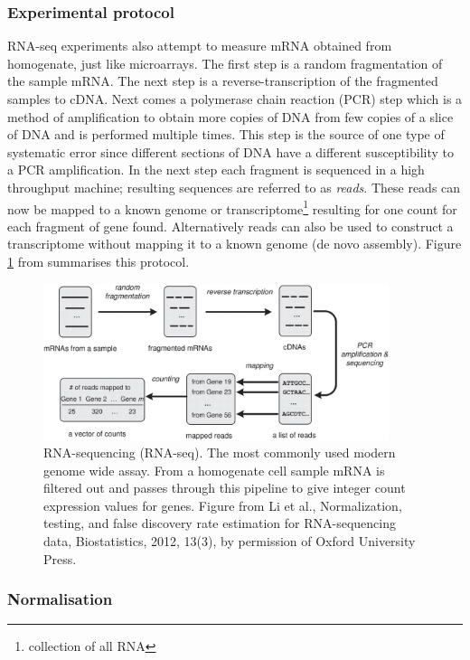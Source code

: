 \subsubsection{Experimental protocol}
\label{sec:technique-bio}

RNA-seq experiments also attempt to measure mRNA obtained from homogenate, just like microarrays. The first step is a random fragmentation of the sample mRNA. The next step is a reverse-transcription of the fragmented samples to cDNA. Next comes a polymerase chain reaction (PCR) step which is a method of amplification to obtain more copies of DNA from few copies of a slice of DNA and is performed multiple times. This step is the source of one type of systematic error since different sections of  DNA have a different susceptibility to a PCR amplification. In the next step each fragment is sequenced in a high throughput machine; resulting sequences are referred to as \emph{reads}. These reads can now be mapped to a known genome or transcriptome\footnote{collection of all RNA} resulting for one count for each fragment of gene found.  Alternatively reads can also be used to construct a transcriptome without mapping it to a known genome (de novo assembly). Figure \ref{fig:li-biostats} from \cite{Li:2012ea} summarises this protocol.

\begin{figure}
  \centering
  \includegraphics[width=0.9\textwidth]{pics/li-biostats12.jpg}
  \caption{RNA-sequencing (RNA-seq). The most commonly used modern genome wide assay. From a homogenate cell sample mRNA is filtered out and passes through this pipeline to give integer count expression values for genes. Figure from Li et al., Normalization, testing, and false discovery rate estimation for RNA-sequencing data, Biostatistics, 2012, 13(3), by permission of Oxford University Press.}
  \label{fig:li-biostats}
\end{figure}

\subsubsection{Normalisation}
\label{sec:normalisation}

